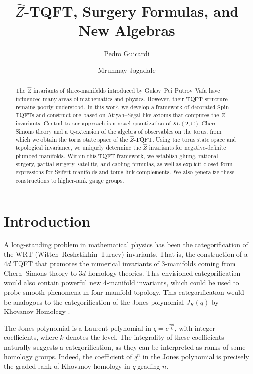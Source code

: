\documentclass{article}
\title{$\hat{Z}$-TQFT, Surgery Formulas, and New Algebras}
\author{Pedro Guicardi}
\author{Mrunmay Jagadale}
\affil{California Institute of Technology, Pasadena, CA 91125, USA}
\date{\vspace{-1cm}}
\numberwithin{corollary}{theorem}
\numberwithin{corollary}{proposition}
\begin{document}
\maketitle

\begin{abstract}
    The $\hat{Z}$ invariants of three-manifolds introduced by Gukov--Pei--Putrov--Vafa have influenced many areas of mathematics and physics. However, their TQFT structure remains poorly understood. In this work, we develop a framework of decorated $\mathrm{Spin}$-TQFTs and construct one based on Atiyah--Segal-like axioms that computes the $\hat{Z}$ invariants. Central to our approach is a novel quantization of $SL(2,\mathbb{C})$ Chern--Simons theory and a $\mathbb{Q}$-extension of the algebra of observables on the torus, from which we obtain the torus state space of the $\hat{Z}$-TQFT. Using the torus state space and topological invariance, we uniquely determine the $\hat{Z}$ invariants for negative-definite plumbed manifolds. Within this TQFT framework, we establish gluing, rational surgery, partial surgery, satellite, and cabling formulas, as well as explicit closed-form expressions for Seifert manifolds and torus link complements. We also generalize these constructions to higher-rank gauge groups.
\end{abstract}

\tableofcontents

\section{Introduction}

A long-standing problem in mathematical physics has been the categorification of the $\mathrm{WRT}$ (Witten--Reshetikhin--Turaev) invariants\cite{Witten89, RT91, CraneFrenkel}. That is, the construction of a $4d$ TQFT that promotes the numerical invariants of 3-manifolds coming from Chern--Simons theory to $3d$ homology theories. This envisioned categorification would also contain powerful new 4-manifold invariants, which could be used to probe smooth phenomena in four-manifold topology. This categorification would be analogous to the categorification of the Jones polynomial $J_K(q)$ by Khovanov Homology \cite{Khovanovhomology, BarNatanKhhomology}.

The Jones polynomial is a Laurent polynomial in $ q = e^{\frac{2 \pi i }{k}}$, with integer coefficients, where $ k$ denotes the level. The integrality of these coefficients naturally suggests a categorification, as they can be interpreted as ranks of some homology groups. Indeed, the coefficient of $q^{n}$ in the Jones polynomial is precisely the graded rank of Khovanov homology in $q$-grading $n$. 
\end{document}
